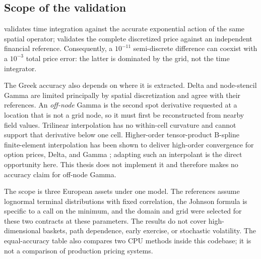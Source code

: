 \subsection{Scope of the validation}\label{sec:validation-limits}

 validates time integration against the accurate exponential action of the same spatial operator;  validates the complete discretized price against an independent financial reference. Consequently, a $10^{-11}$ semi-discrete difference can coexist with a $10^{-3}$ total price error: the latter is dominated by the grid, not the time integrator.

The Greek accuracy also depends on where it is extracted. Delta and node-stencil Gamma are limited principally by spatial discretization and agree with their references. An \emph{off-node} Gamma is the second spot derivative requested at a location that is not a grid node, so it must first be reconstructed from nearby field values. Trilinear interpolation has no within-cell curvature and cannot support that derivative below one cell. Higher-order tensor-product B-spline finite-element interpolation has been shown to deliver high-order convergence for option prices, Delta, and Gamma \cite{raahauge-2004}; adapting such an interpolant is the direct opportunity here. This thesis does not implement it and therefore makes no accuracy claim for off-node Gamma.

The scope is three European assets under one model. The references assume lognormal terminal distributions with fixed correlation, the Johnson formula is specific to a call on the minimum, and the domain and grid were selected for these two contracts at these parameters. The results do not cover high-dimensional baskets, path dependence, early exercise, or stochastic volatility. The equal-accuracy table also compares two CPU methods inside this codebase; it is not a comparison of production pricing systems.
